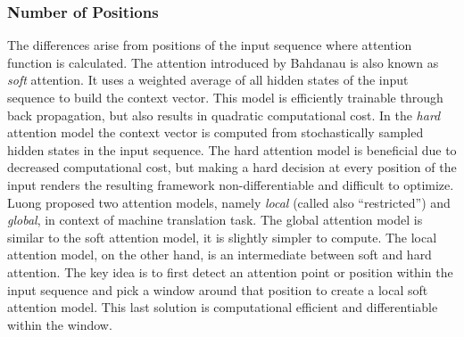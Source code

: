 \documentclass[11pt]{article}
\begin{document}
\subsubsection{Number of Positions}
The differences arise from positions of the input sequence where attention function is calculated. The attention introduced by Bahdanau\cite{Bahdanau} is also known as \emph{soft} attention. It uses a weighted average of all hidden states of the input sequence to build the context vector. This model is efficiently trainable through back propagation, but also results in quadratic computational cost. In the \emph{hard} attention model the context vector is computed from stochastically sampled hidden states in the input sequence. The hard attention model is beneficial due to decreased computational cost, but making a hard decision at every position of the input renders the resulting framework non-differentiable and difficult to optimize. Luong\cite{luo} proposed two attention models, namely \emph{local} (called also ``restricted'') and \emph{global}, in context of machine translation task. The global attention model is similar to the soft attention model, it is slightly simpler to compute. The local attention model, on the other hand, is an intermediate between soft and hard attention. The key idea is to first detect an attention point or position within the input sequence and pick a window around that position to create a local soft attention model. This last solution is computational efficient and differentiable within the window.
\end{document}
